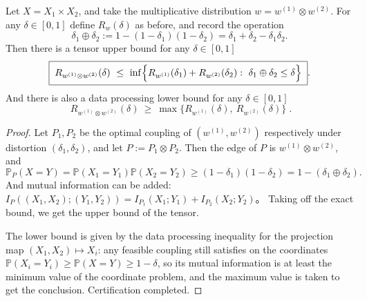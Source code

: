 \begin{theorem}\label{thm:pom-diagonal-rate-tensor-upper-bound}
Let \(X=X_1\times X_2\), and take the multiplicative distribution \(w=w^{(1)}\otimes w^{(2)}\).
For any \(\delta\in[0,1]\) define \(R_w(\delta)\) as before, and record the operation
\[
\delta_1\oplus\delta_2:=1-(1-\delta_1)(1-\delta_2)=\delta_1+\delta_2-\delta_1\delta_2.
\]
Then there is a tensor upper bound for any \(\delta\in[0,1]\)
\[
\boxed{\;
R_{w^{(1)}\otimes w^{(2)}}(\delta)\ \le\
\inf\Bigl\{R_{w^{(1)}}(\delta_1)+R_{w^{(2)}}(\delta_2):\ \delta_1\oplus\delta_2\le \delta\Bigr\}\; }.
\]
And there is also a data processing lower bound for any \(\delta\in[0,1]\)
\[
\boxed{\;
R_{w^{(1)}\otimes w^{(2)}}(\delta)\ \ge\ \max\bigl\{R_{w^{(1)}}(\delta),\ R_{w^{(2)}}(\delta)\bigr\}\; }.
\]
\end{theorem}
\begin{proof}
Let \(P_1,P_2\) be the optimal coupling of \((w^{(1)},w^{(2)})\) respectively under distortion \((\delta_1,\delta_2)\), and let \(P:=P_1\otimes P_2\).
Then the edge of \(P\) is \(w^{(1)}\otimes w^{(2)}\), and
\[
\mathbb P_P(X=Y)=\mathbb P(X_1=Y_1)\mathbb P(X_2=Y_2)\ge (1-\delta_1)(1-\delta_2)=1-(\delta_1\oplus\delta_2).
\]
And mutual information can be added:
\(
I_P((X_1,X_2);(Y_1,Y_2))=I_{P_1}(X_1;Y_1)+I_{P_2}(X_2;Y_2)
\)。
Taking off the exact bound, we get the upper bound of the tensor.
\par
The lower bound is given by the data processing inequality for the projection map \((X_1,X_2)\mapsto X_i\): any feasible coupling still satisfies on the coordinates
\(
\mathbb P(X_i=Y_i)\ge \mathbb P(X=Y)\ge 1-\delta
\), so its mutual information is at least the minimum value of the coordinate problem, and the maximum value is taken to get the conclusion. Certification completed.
\end{proof}

